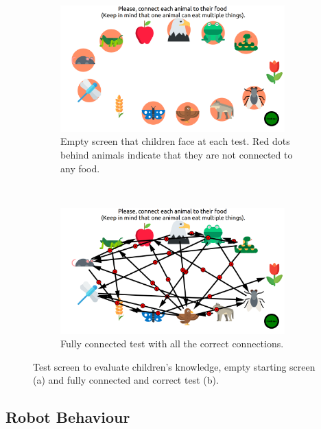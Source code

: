 \begin{figure}[ht]
	\centering
	\begin{subfigure}[t]{0.5\textwidth}
		\centering
		\includegraphics[width=0.95\textwidth]{empty_graph.png}
		\captionsetup{width=.95\linewidth}
		\caption{Empty screen that children face at each test. Red dots behind animals indicate that they are not connected to any food.}
	\end{subfigure}%
	~ 
	\begin{subfigure}[t]{0.5\textwidth}
		\centering
		\includegraphics[width=0.95\textwidth]{full_graph.png}
		\captionsetup{width=.95\linewidth}
		\caption{Fully connected test with all the correct connections.}
	\end{subfigure}
	\caption{Test screen to evaluate children's knowledge, empty starting screen (a) and fully connected and correct test (b).}
	\label{fig:test}
\end{figure}

\subsection{Robot Behaviour} \label{sec:tuto_robot}

